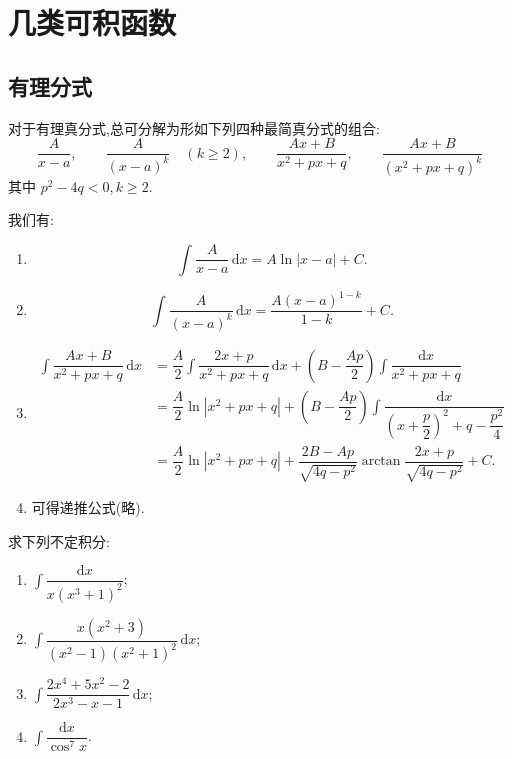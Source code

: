 \newpage

\section{几类可积函数}


\subsection{有理分式}

对于有理真分式,总可分解为形如下列四种最简真分式的组合:
\[
    \dfrac{A}{x-a},\qquad
    \dfrac{A}{(x-a)^k}\quad(k\geq2),\qquad
    \dfrac{Ax+B}{x^2+px+q},\qquad
    \dfrac{Ax+B}{(x^2+px+q)^k}
\]
其中 $p^2-4q<0,k\geq2$.

我们有:
\begin{enumerate}
    \item
          \[
              \int\dfrac{A}{x-a}\,\mathrm{d}x=A\ln|x-a|+C.
          \]
    \item
          \[
              \int\dfrac{A}{(x-a)^k}\,\mathrm{d}x
              =\dfrac{A(x-a)^{1-k}}{1-k}+C.
          \]
    \item
          \begin{align*}
              \int\dfrac{Ax+B}{x^2+px+q}\,\mathrm{d}x
               & =\dfrac{A}{2}\int\dfrac{2x+p}{x^2+px+q}\,\mathrm{d}x
              +\left(B-\dfrac{Ap}{2}\right)\int\dfrac{\mathrm{d}x}{x^2+px+q}          \\
               & =\dfrac{A}{2}\ln|x^2+px+q|
              +\left(B-\dfrac{Ap}{2}\right)
              \int\dfrac{\mathrm{d}x}{\left(x+\dfrac{p}{2}\right)^2+q-\dfrac{p^2}{4}} \\
               & =\dfrac{A}{2}\ln|x^2+px+q|
              +\dfrac{2B-Ap}{\sqrt{4q-p^2}}
              \arctan\dfrac{2x+p}{\sqrt{4q-p^2}}+C.
          \end{align*}
    \item 可得递推公式(略).
\end{enumerate}

\begin{example}
    求下列不定积分:
    \begin{enumerate}
        \item $\displaystyle\int\dfrac{\mathrm{d}x}{x(x^3+1)^2}$;
        \item $\displaystyle\int\dfrac{x(x^2+3)}{(x^2-1)(x^2+1)^2}\,\mathrm{d}x$;
        \item $\displaystyle\int\dfrac{2x^4+5x^2-2}{2x^3-x-1}\,\mathrm{d}x$;
        \item $\displaystyle\int\dfrac{\mathrm{d}x}{\cos^7x}$.
    \end{enumerate}
\end{example}
\exampleblank

